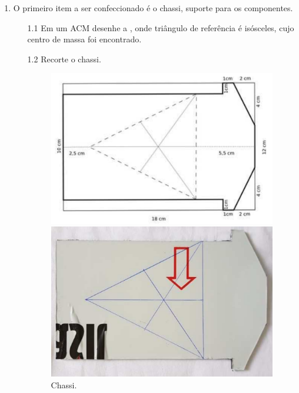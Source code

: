 \documentclass{textolivre}
\begin{document}
\begin{enumerate}
\item O primeiro item a ser confeccionado é o chassi, suporte para os componentes.
    \begin{enumerate}
    \item[1.1] Em um ACM desenhe a , onde triângulo de referência é isósceles, cujo centro de massa foi encontrado.
    \item[1.2] Recorte o chassi.

    \begin{figure}[h!]
    \begin{minipage}{0.47\textwidth}
    \includegraphics[width=\linewidth]{figure-01.pdf}
    \subcaption{}
    \end{minipage}
    \hfill
    \begin{minipage}{0.47\textwidth}
    \includegraphics[width=\linewidth]{figure-02.pdf}
    \subcaption{}
    \end{minipage}
    \caption{Chassi.}
    \label{fig01}
    \end{figure}


\end{enumerate}
\end{enumerate}
\end{document}
